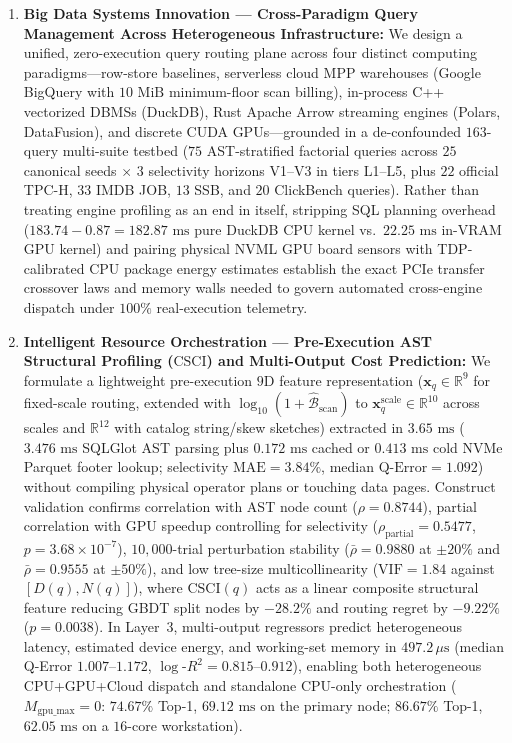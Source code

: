 \documentclass[10pt,a4paper]{article}
\begin{document}
\begin{enumerate}
\item \textbf{Big Data Systems Innovation --- Cross-Paradigm Query Management Across Heterogeneous Infrastructure:} We design a unified, zero-execution query routing plane across four distinct computing paradigms---row-store baselines, serverless cloud MPP warehouses (Google BigQuery with $10\text{ MiB}$ minimum-floor scan billing), in-process C++ vectorized DBMSs (DuckDB), Rust Apache Arrow streaming engines (Polars, DataFusion), and discrete CUDA GPUs---grounded in a de-confounded $163$-query multi-suite testbed ($75$ AST-stratified factorial queries across $25$ canonical seeds $\times$ $3$ selectivity horizons V1--V3 in tiers L1--L5, plus $22$ official TPC-H, $33$ IMDB JOB, $13$ SSB, and $20$ ClickBench queries). Rather than treating engine profiling as an end in itself, stripping SQL planning overhead ($183.74 - 0.87 = 182.87\text{ ms}$ pure DuckDB CPU kernel vs.\ $22.25\text{ ms}$ in-VRAM GPU kernel) and pairing physical NVML GPU board sensors with TDP-calibrated CPU package energy estimates establish the exact PCIe transfer crossover laws and memory walls needed to govern automated cross-engine dispatch under $100\%$ real-execution telemetry.

\item \textbf{Intelligent Resource Orchestration --- Pre-Execution AST Structural Profiling ($\text{CSCI}$) and Multi-Output Cost Prediction:} We formulate a lightweight pre-execution $9\text{D}$ feature representation ($\mathbf{x}_q \in \mathbb{R}^{9}$ for fixed-scale routing, extended with $\log_{10}(1+\hat{\mathcal{B}}_{\text{scan}})$ to $\mathbf{x}_q^{\text{scale}} \in \mathbb{R}^{10}$ across scales and $\mathbb{R}^{12}$ with catalog string/skew sketches) extracted in $3.65\text{ ms}$ ($3.476\text{ ms}$ SQLGlot AST parsing plus $0.172\text{ ms}$ cached or $0.413\text{ ms}$ cold NVMe Parquet footer lookup; selectivity $\text{MAE}=3.84\%$, median $\text{Q-Error}=1.092$) without compiling physical operator plans or touching data pages. Construct validation confirms correlation with AST node count ($\rho=0.8744$), partial correlation with GPU speedup controlling for selectivity ($\rho_{\text{partial}}=0.5477$, $p=3.68\times 10^{-7}$), $10{,}000$-trial perturbation stability ($\bar{\rho}=0.9880$ at $\pm 20\%$ and $\bar{\rho}=0.9555$ at $\pm 50\%$), and low tree-size multicollinearity ($\text{VIF}=1.84$ against $[D(q), N(q)]$), where $\text{CSCI}(q)$ acts as a linear composite structural feature reducing GBDT split nodes by $-28.2\%$ and routing regret by $-9.22\%$ ($p=0.0038$). In Layer~3, multi-output regressors predict heterogeneous latency, estimated device energy, and working-set memory in $497.2\,\mu\text{s}$ (median Q-Error $1.007\text{--}1.172$, $\log\text{-}R^{2}=0.815\text{--}0.912$), enabling both heterogeneous CPU+GPU+Cloud dispatch and standalone CPU-only orchestration ($M_{\text{gpu\_max}}=0$: $74.67\%$ Top-1, $69.12\text{ ms}$ on the primary node; $86.67\%$ Top-1, $62.05\text{ ms}$ on a $16$-core workstation).


\end{enumerate}
\end{document}
